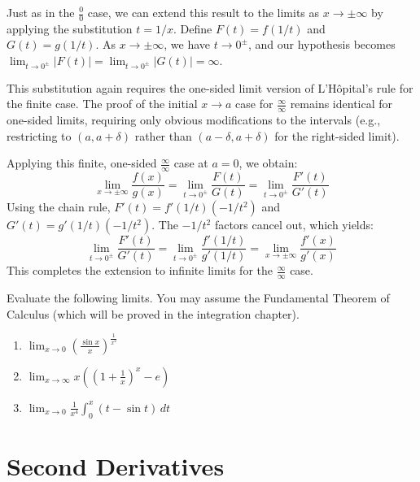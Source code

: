 \documentclass[../analysis1.tex]{subfiles}
\begin{document}
\begin{remark}
    Just as in the $\frac{0}{0}$ case, we can extend this result to the limits as $x\to\pm\infty$ by applying the substitution $t = 1/x$. Define $F(t) = f(1/t)$ and $G(t) = g(1/t)$. As $x \to \pm\infty$, we have $t \to 0^\pm$, and our hypothesis becomes $\lim_{t\to 0^\pm}|F(t)| = \lim_{t\to 0^\pm}|G(t)| = \infty$. 
    
    This substitution again requires the one-sided limit version of L'H\^opital's rule for the finite case. The proof of the initial $x \to a$ case for $\frac{\infty}{\infty}$ remains identical for one-sided limits, requiring only obvious modifications to the intervals (e.g., restricting to $(a, a+\delta)$ rather than $(a-\delta, a+\delta)$ for the right-sided limit).
    
    Applying this finite, one-sided $\frac{\infty}{\infty}$ case at $a=0$, we obtain:
    $$\lim_{x\to\pm\infty} \frac{f(x)}{g(x)} = \lim_{t\to 0^\pm} \frac{F(t)}{G(t)} = \lim_{t\to 0^\pm} \frac{F'(t)}{G'(t)}$$
    Using the chain rule, $F'(t) = f'(1/t)(-1/t^2)$ and $G'(t) = g'(1/t)(-1/t^2)$. The $-1/t^2$ factors cancel out, which yields:
    $$\lim_{t\to 0^\pm} \frac{F'(t)}{G'(t)} = \lim_{t\to 0^\pm} \frac{f'(1/t)}{g'(1/t)} = \lim_{x\to\pm\infty} \frac{f'(x)}{g'(x)}$$
    This completes the extension to infinite limits for the $\frac{\infty}{\infty}$ case.
\end{remark}

\begin{exercise*}
    Evaluate the following limits. You may assume the Fundamental Theorem of Calculus (which will be proved in the integration chapter).
    
    \begin{enumerate}
        \item[(a)] $\displaystyle \lim_{x \to 0} \left( \frac{\sin x}{x} \right)^{\frac{1}{x^2}}$
        
        \item[(b)] $\displaystyle \lim_{x\to\infty} x \left( \left( 1 + \frac{1}{x} \right)^x - e \right)$
        
        \item[(c)] $\displaystyle \lim_{x \to 0} \frac{1}{x^4} \int_0^x (t - \sin t) \,dt$
    \end{enumerate}
\end{exercise*}

\section{Second Derivatives}
\end{document}
